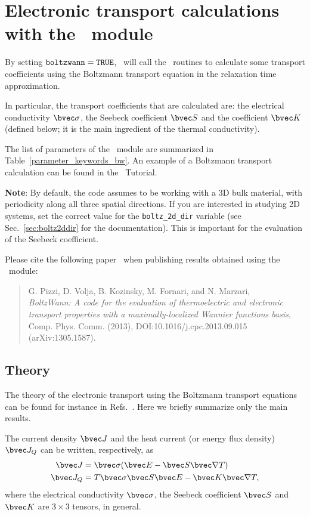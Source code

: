 \chapter{Electronic transport calculations with the \bw\ module}\label{ch:boltzwann}

By setting $\verb#boltzwann#=\verb#TRUE#$, \postw\ will call the \bw\ routines to calculate some transport coefficients using the Boltzmann transport equation in the relaxation time approximation.

In particular, the transport coefficients that are calculated are: the electrical conductivity $\bvec \sigma$, the Seebeck coefficient $\bvec S$ and the coefficient $\bvec K$ (defined below; it is the main ingredient of the thermal conductivity). 

The list of parameters of the \bw\ module are summarized in Table~\ref{parameter_keywords_bw}. 
An example of a Boltzmann transport calculation can be found in the \wannier\ Tutorial. 

\textbf{Note}: By default, the code assumes to be working with a 3D bulk material, with periodicity along all three spatial directions. If you are interested in studying 2D systems, set the correct value for the \texttt{boltz\_2d\_dir} variable (see Sec.~\ref{sec:boltz2ddir} for the documentation). This is important for the evaluation of the Seebeck coefficient.

Please cite the following paper~\cite{pizzi-cpc13} when publishing results obtained using the \bw\  module:
\begin{quote}
G. Pizzi, D. Volja, B. Kozinsky, M. Fornari, and N. Marzari, \\
\emph{BoltzWann: A code for the evaluation of thermoelectric and electronic transport properties with a maximally-localized Wannier functions basis},\\
Comp. Phys. Comm. (2013), DOI:10.1016/j.cpc.2013.09.015 (arXiv:1305.1587).
\end{quote}

\section{Theory}
\label{sec:boltzwann-theory}
The theory of the electronic transport using the Boltzmann transport equations can be found for instance in Refs.~\cite{ziman-book72,grosso-book00,mahan-itc06}. Here we briefly summarize only the main results. 

The current density $\bvec J$ and the heat current (or energy flux density) $\bvec J_Q$ can be written, respectively, as
\begin{align}
  \bvec J   &= \bvec \sigma(\bvec E - \bvec S \bvec \nabla T) \\
  \bvec J_Q &= T \bvec \sigma \bvec S \bvec E - \bvec K \bvec \nabla T,
\end{align}
where the electrical conductivity $\bvec \sigma$, the Seebeck coefficient $\bvec S$ and $\bvec K$ are $3\times 3$ tensors, in general.

